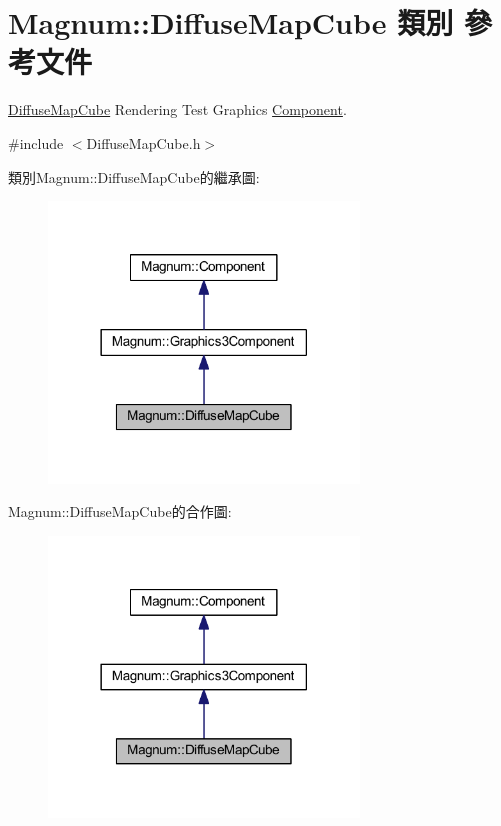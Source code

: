 \hypertarget{class_magnum_1_1_diffuse_map_cube}{}\section{Magnum\+:\+:Diffuse\+Map\+Cube 類別 參考文件}
\label{class_magnum_1_1_diffuse_map_cube}


\hyperlink{class_magnum_1_1_diffuse_map_cube}{Diffuse\+Map\+Cube} Rendering Test Graphics \hyperlink{class_magnum_1_1_component}{Component}.  




{\ttfamily \#include $<$Diffuse\+Map\+Cube.\+h$>$}



類別\+Magnum\+:\+:Diffuse\+Map\+Cube的繼承圖\+:\nopagebreak
\begin{figure}[H]
\begin{center}
\leavevmode
\includegraphics[width=234pt]{class_magnum_1_1_diffuse_map_cube__inherit__graph}
\end{center}
\end{figure}


Magnum\+:\+:Diffuse\+Map\+Cube的合作圖\+:\nopagebreak
\begin{figure}[H]
\begin{center}
\leavevmode
\includegraphics[width=234pt]{class_magnum_1_1_diffuse_map_cube__coll__graph}
\end{center}
\end{figure}
